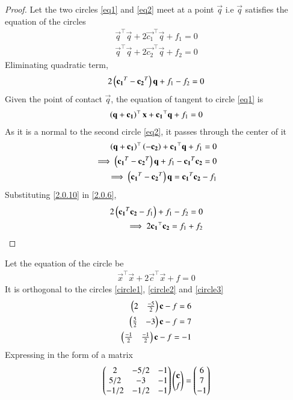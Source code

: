 \documentclass[journal,12pt,twocolumn]{IEEEtran}
\begin{document}
\begin{proof}
Let the two circles \eqref{eq1} and \eqref{eq2} meet at a point $\vec{q}$ i.e $\vec{q}$ satisfies the equation of the circles
\begin{align}
    \vec{q}^\top\vec{q} + 2\vec{c_1}^\top\vec{q} + f_1 = 0 \label{2.0.4}\\
    \vec{q}^\top\vec{q} + 2\vec{c_2}^\top\vec{q} + f_2 = 0 \label{2.0.5}
\end{align}
Eliminating quadratic term,
\begin{align}
    2\left(\mathbf{c_1}^T - \mathbf{c_2}^T\right)\mathbf{q} + f_1 - f_2 = 0 \label{2.0.6}
\end{align}
Given the point of contact $\vec{q}$, the equation of tangent to circle \eqref{eq1} is
\begin{align}
    \left(\mathbf{q}+\mathbf{c_1}\right)^\top\mathbf{x} + \mathbf{c_1}^\top\mathbf{q} + f_1 = 0 
\end{align}
As it is a normal to the second circle \eqref{eq2}, it passes through the center of it
\begin{align}
    \left(\mathbf{q}+\mathbf{c_1}\right)^\top\left(\mathbf{-c_2}\right) + \mathbf{c_1}^\top\mathbf{q} + f_1 = 0 \\
    \implies \left(\mathbf{c_1}^T - \mathbf{c_2}^T\right)\mathbf{q} + f_1 - \mathbf{c_1}^T\mathbf{c_2} = 0 \\
    \implies \left(\mathbf{c_1}^T - \mathbf{c_2}^T\right)\mathbf{q} = \mathbf{c_1}^T\mathbf{c_2} - f_1
    \label{2.0.10}
\end{align}
Substituting \eqref{2.0.10} in \eqref{2.0.6},
\begin{align}
    2\left(\mathbf{c_1}^T\mathbf{c_2} - f_1\right)  + f_1 - f_2 = 0 \\
    \implies 2\mathbf{c_1}^\top\mathbf{c_2} = f_1 + f_2 
\end{align}
\end{proof}
Let the equation of the circle be
\begin{align}
    \vec{x}^\top\vec{x} + 2\vec{c}^\top\vec{x} + f = 0
\end{align}
It is orthogonal to the circles \eqref{circle1}, \eqref{circle2} and \eqref{circle3}
\begin{align}
    \begin{pmatrix}2&\frac{-5}{2}\end{pmatrix}\mathbf{c} - f = 6\\
    \begin{pmatrix}\frac{5}{2}&-3\end{pmatrix}\mathbf{c} - f = 7\\
    \begin{pmatrix}\frac{-1}{2}&\frac{-1}{2}\end{pmatrix}\mathbf{c} - f = -1
\end{align}
Expressing in the form of a matrix
\begin{align}
    \begin{pmatrix}2&-5/2&-1\\5/2&-3&-1\\-1/2&-1/2&-1\end{pmatrix}\begin{pmatrix}\mathbf{c}\\f\end{pmatrix} = \begin{pmatrix}6\\7\\-1\end{pmatrix}
\end{align}
\end{document}
